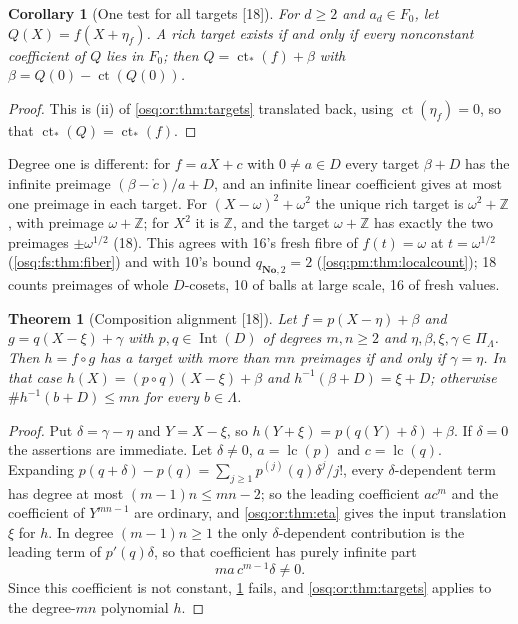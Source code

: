\documentclass[11pt,letterpaper]{article}
\numberwithin{equation}{section}
\newtheorem{theorem}{Theorem}[section]
\newtheorem{corollary}[corollary]{Corollary}
\theoremstyle{definition}
\theoremstyle{remark}
\theoremstyle{plain}
\newcommand{\No}{\mathbf{No}}
\newcommand{\Z}{\mathbb Z}
\newcommand{\ct}{\operatorname{ct}}
\newcommand{\Int}{\operatorname{Int}}
\newcommand{\lc}{\operatorname{lc}}
\newcommand{\src}[1]{\textup{\textsf{[#1]}}}
\begin{document}
\begin{corollary}[One test for all targets \src{18}]\label{osq:or:cor:targettest}
For $d\ge2$ and $a_d\in F_0$, let $Q(X)=f(X+\eta_f)$. A rich target exists if and only if every nonconstant coefficient of $Q$ lies in $F_0$; then
$Q=\ct_*(f)+\beta$ with $\beta=Q(0)-\ct(Q(0))$.
\end{corollary}
\begin{proof}
This is (ii) of \cref{osq:or:thm:targets} translated back, using $\ct(\eta_f)=0$, so that $\ct_*(Q)=\ct_*(f)$.
\end{proof}

Degree one is different: for $f=aX+c$ with $0\ne a\in D$ every target $\beta+D$ has the infinite preimage $(\beta-\mathring c)/a+D$, and an infinite
linear coefficient gives at most one preimage in each target. For $(X-\omega)^2+\omega^2$ the unique rich target is $\omega^2+\Z$, with preimage
$\omega+\Z$; for $X^2$ it is $\Z$, and the target $\omega+\Z$ has exactly the two preimages $\pm\omega^{1/2}$ (18). This agrees with 16's fresh fibre
of $f(t)=\omega$ at $t=\omega^{1/2}$ (\cref{osq:fs:thm:fiber}) and with 10's bound $q_{\No,2}=2$ (\cref{osq:pm:thm:localcount}); 18 counts preimages
of whole $D$-cosets, 10 of balls at large scale, 16 of fresh values.

\begin{theorem}[Composition alignment \src{18}]\label{osq:or:thm:composition}
Let $f=p(X-\eta)+\beta$ and $g=q(X-\xi)+\gamma$ with $p,q\in\Int(D)$ of degrees $m,n\ge2$ and $\eta,\beta,\xi,\gamma\in\Pi_\Lambda$. Then $h=f\circ g$
has a target with more than $mn$ preimages if and only if $\gamma=\eta$. In that case $h(X)=(p\circ q)(X-\xi)+\beta$ and $h^{-1}(\beta+D)=\xi+D$;
otherwise $\#h^{-1}(b+D)\le mn$ for every $b\in\Lambda$.
\end{theorem}
\begin{proof}
Put $\delta=\gamma-\eta$ and $Y=X-\xi$, so $h(Y+\xi)=p(q(Y)+\delta)+\beta$. If $\delta=0$ the assertions are immediate. Let $\delta\ne0$, $a=\lc(p)$ and
$c=\lc(q)$. Expanding $p(q+\delta)-p(q)=\sum_{j\ge1}p^{(j)}(q)\delta^j/j!$, every $\delta$-dependent term has degree at most $(m-1)n\le mn-2$; so the leading
coefficient $ac^m$ and the coefficient of $Y^{mn-1}$ are ordinary, and \cref{osq:or:thm:eta} gives the input translation $\xi$ for $h$. In degree
$(m-1)n\ge1$ the only $\delta$-dependent contribution is the leading term of $p'(q)\delta$, so that coefficient has purely infinite part
\[
 ma\,c^{m-1}\delta\ne0 .
\]
Since this coefficient is not constant, \cref{osq:or:cor:targettest} fails, and \cref{osq:or:thm:targets} applies to the degree-$mn$ polynomial $h$.
\end{proof}
\end{document}
